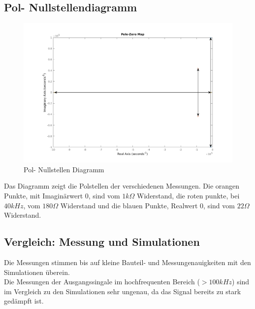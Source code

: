 \subsection{Pol- Nullstellendiagramm}

\begin{figure}[H]
  \begin{center}
    \includegraphics[width=1\textwidth]{./PoleZeroMap.png}
    \caption{Pol- Nullstellen Diagramm}
  \end{center}
\end{figure}
\noindent
Das Diagramm zeigt die Polstellen der verschiedenen Messungen. Die orangen Punkte, mit Imaginärwert 0, sind vom $1k\Omega$ Widerstand, die roten punkte, bei $40kHz$, vom $180\Omega$ Widerstand und die
blauen Punkte, Realwert 0, sind vom $22\Omega$ Widerstand.\\

\subsection{Vergleich: Messung und Simulationen}
Die Messungen stimmen bis auf kleine Bauteil- und Messungenauigkeiten mit den Simulationen \"uberein. \\
Die Messungen der Ausgangssingale im hochfrequenten Bereich ($>100kHz$) sind im Vergleich zu den Simulationen sehr ungenau, da das Signal bereits zu stark ged\"ampft ist.
